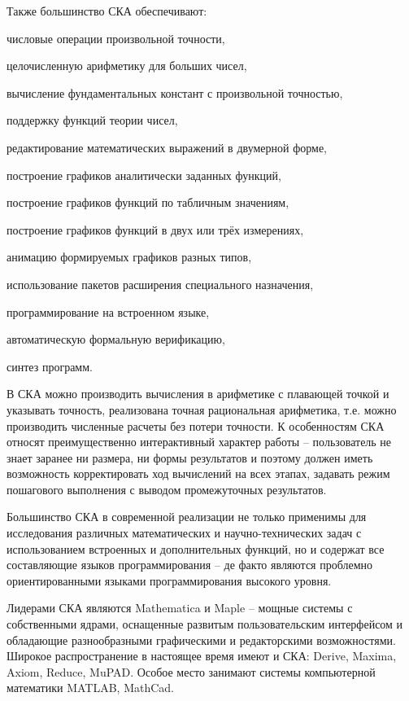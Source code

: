Также большинство СКА обеспечивают:
\begin{textitemize}
	\item числовые операции произвольной точности, 
	\item целочисленную арифметику для больших чисел, 
	\item вычисление фундаментальных констант с произвольной точностью, 
	\item поддержку функций теории чисел, 
	\item редактирование математических выражений в двумерной форме, 
	\item построение графиков аналитически заданных функций, 
	\item построение графиков функций по табличным значениям, 
	\item построение графиков функций в двух или трёх измерениях, 
	\item анимацию формируемых графиков разных типов, 
	\item использование пакетов расширения специального назначения, 
	\item программирование на встроенном языке, 
	\item автоматическую формальную верификацию, 
	\item синтез программ.
\end{textitemize}

В СКА можно производить вычисления в арифметике с плавающей точкой и указывать точность, реализована точная рациональная арифметика, т.е. можно производить численные расчеты без потери точности.
К особенностям СКА относят преимущественно интерактивный характер работы – пользователь не знает заранее ни размера, ни формы результатов и поэтому должен иметь возможность корректировать ход вычислений на всех этапах, задавать режим пошагового выполнения с выводом промежуточных результатов.

Большинство СКА в современной реализации не только применимы для исследования различных математических и научно-технических задач с использованием встроенных и дополнительных функций, но и содержат все составляющие языков программирования -- де факто являются проблемно ориентированными языками программирования высокого уровня. 

Лидерами СКА являются Mathematica и Maple -- мощные системы с собственными ядрами, оснащенные развитым пользовательским интерфейсом и обладающие разнообразными графическими и редакторскими возможностями. Широкое распространение в настоящее время имеют и СКА: Derive, Maxima, Axiom, Reduce, MuPAD. Особое место занимают системы компьютерной математики MATLAB, MathCad.

